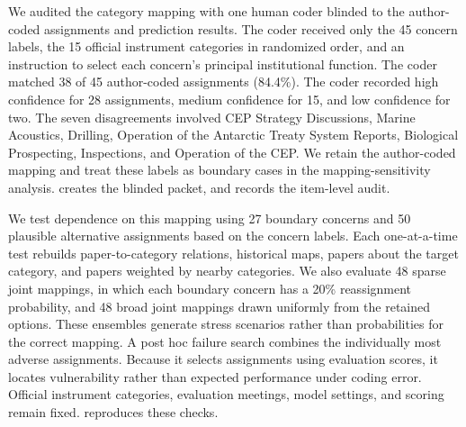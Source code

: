 \documentclass{fun_article}
\begin{document}
We audited the category mapping with one human coder blinded to the author-coded assignments and prediction results. The coder received only the 45 concern labels, the 15 official instrument categories in randomized order, and an instruction to select each concern's principal institutional function. The coder matched 38 of 45 author-coded assignments (84.4\%). The coder recorded high confidence for 28 assignments, medium confidence for 15, and low confidence for two. The seven disagreements involved CEP Strategy Discussions, Marine Acoustics, Drilling, Operation of the Antarctic Treaty System Reports, Biological Prospecting, Inspections, and Operation of the CEP. We retain the author-coded mapping and treat these labels as boundary cases in the mapping-sensitivity analysis. \texttt{} creates the blinded packet, and \texttt{} records the item-level audit.

We test dependence on this mapping using 27 boundary concerns and 50 plausible alternative assignments based on the concern labels. Each one-at-a-time test rebuilds paper-to-category relations, historical maps, papers about the target category, and papers weighted by nearby categories. We also evaluate 48 sparse joint mappings, in which each boundary concern has a 20\% reassignment probability, and 48 broad joint mappings drawn uniformly from the retained options. These ensembles generate stress scenarios rather than probabilities for the correct mapping. A post hoc failure search combines the individually most adverse assignments. Because it selects assignments using evaluation scores, it locates vulnerability rather than expected performance under coding error. Official instrument categories, evaluation meetings, model settings, and scoring remain fixed. \texttt{} reproduces these checks.
\end{document}
